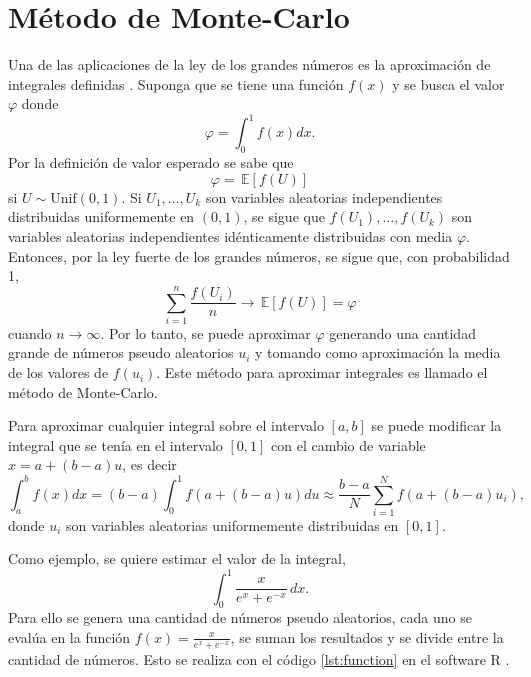 \documentclass[12pt,letterpaper]{article}
\newcommand\esp[1]{\, \mathbb{E} \left\lbrack #1 \right\rbrack}
\begin{document}
\section{Método de Monte-Carlo}
Una de las aplicaciones de la ley de los grandes números es la aproximación de integrales definidas \cite{stochastic_simulation}. Suponga que se tiene una función $f(x)$ y se busca el valor $\varphi$ donde 
\begin{equation}
\varphi = \int_{0}^{1} f(x) dx.
\end{equation}
Por la definición de valor esperado se sabe que 
\begin{equation}
\varphi = \esp{f(U)}
\end{equation}
si $U \sim \mathrm{Unif}(0,1)$. Si $U_1, \ldots, U_k$ son variables aleatorias independientes distribuidas uniformemente en $(0,1)$, se sigue que $f(U_1), \ldots, f(U_k)$ son variables aleatorias independientes idénticamente distribuidas con media $\varphi$. Entonces, por la ley fuerte de los grandes números, se sigue que, con probabilidad 1, 
\begin{equation}
\sum^{n}_{i=1} \frac{f(U_{i})}{n} \longrightarrow \esp{f(U)} = \varphi
\end{equation}
cuando $n \longrightarrow \infty$. Por lo tanto, se puede aproximar $\varphi$ generando una cantidad grande de números pseudo aleatorios $u_i$ y tomando como aproximación la media de los valores de $f(u_i)$. Este método para aproximar integrales es llamado el método de Monte-Carlo.

Para aproximar cualquier integral sobre el intervalo $[a,b]$ se puede modificar la integral que se tenía en el intervalo $[0,1]$ con el cambio de variable $x=a+(b-a)u$, es decir
\begin{equation}
\int_a^b f(x) dx = (b-a)\int^1_0 f(a+(b-a)u)du \approx \frac{b-a}{N}\sum^N_{i=1}f(a+(b-a)u_i), 
\end{equation}
donde $u_i$ son variables aleatorias uniformemente distribuidas en $[0,1]$.

Como ejemplo, se quiere estimar el valor de la integral,
\begin{equation}
\label{integral}
\int^1_0 \frac{x}{e^x + e^{-x}} \, dx.
\end{equation}
Para ello se genera una cantidad de números pseudo aleatorios, cada uno se evalúa en la función $f(x)=\frac{x}{e^x+e^{-x}}$, se suman los resultados y se divide entre la cantidad de números. Esto se realiza con el código \ref{lst:function} en el software R \cite{R}. 
\end{document}

